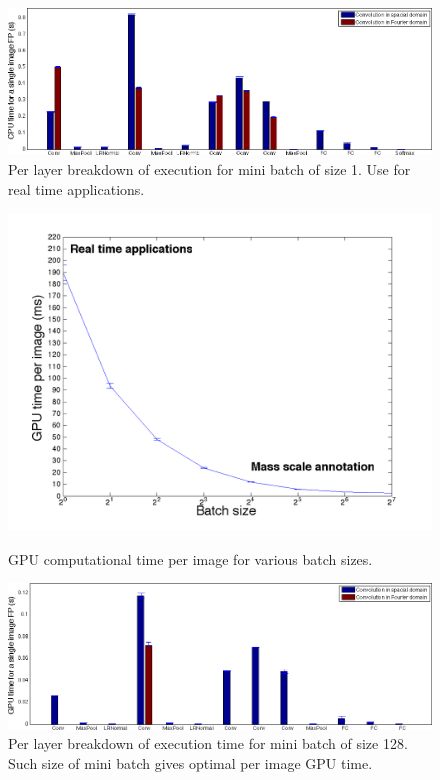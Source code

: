\documentclass{article}
\begin{document}
\begin{figure}[h]
\begin{minipage}[b]{0.48\linewidth}
  	\vspace{2mm}
	\includegraphics[width=\textwidth]{img/eval_per_layer_per_batch_1_batch_size.png}
  	\caption{Per layer breakdown of execution for mini batch of size 1. Use for real time applications.}
  \end{minipage}
\end{figure}


\begin{figure}[h]
  \begin{minipage}[b]{0.48\linewidth}
  	\includegraphics[width=\textwidth]{img/eval_per_batch_GPU.png}
  	\caption{GPU computational time per image for various batch sizes.}
  \end{minipage}
  \hspace{2mm}
  \begin{minipage}[b]{0.48\linewidth}
  	\includegraphics[width=\textwidth]{img/eval_per_layer_per_batch_GPU_128_batch_size.png}
  	\caption{Per layer breakdown of execution time for mini batch of size 128. Such size of mini batch gives optimal per image GPU time.}
  \end{minipage}
\end{figure}
\end{document}
